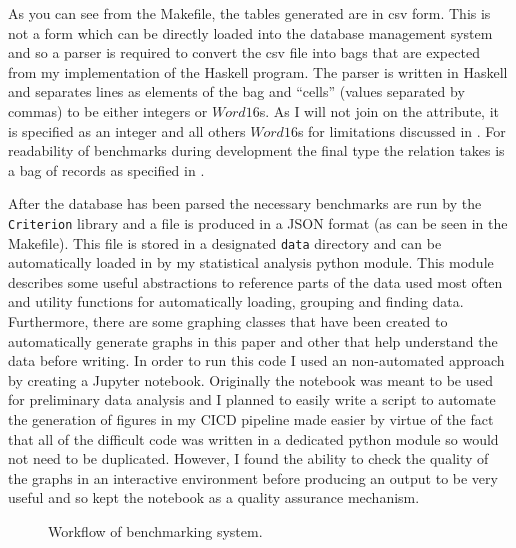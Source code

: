As you can see from the Makefile, the tables generated are in csv form. This is
not a form which can be directly loaded into the database management system and
so a parser is required to convert the csv file into bags that are expected from
my implementation of the Haskell program. The parser is written in Haskell and
separates lines as elements of the bag and ``cells'' (values separated by
commas) to be either integers or $Word16$s. As I will not join on the
 attribute, it is specified as an integer and all
others $Word16$s for limitations discussed in . For
readability of benchmarks during development the final type the
 relation takes is a bag of records as specified in
.

After the database has been parsed the necessary benchmarks are run by the
\verb|Criterion| library and a file is produced in a JSON format (as can be seen
in the Makefile). This file is stored in a designated \verb|data| directory and
can be automatically loaded in by my statistical analysis python module. This
module describes some useful abstractions to reference parts of the data used
most often and utility functions for automatically loading, grouping and finding
data. Furthermore, there are some graphing classes that have been created to
automatically generate graphs in this paper and other that help understand the
data before writing. In order to run this code I used an non-automated approach
by creating a Jupyter notebook. Originally the notebook was meant to be used for
preliminary data analysis and I planned to easily write a script to automate the
generation of figures in my CICD pipeline made easier by virtue of the fact that 
all of the difficult code was written in a dedicated python module so would not
need to be duplicated. However, I found the ability to check the quality of the
graphs in an interactive environment before producing an output to be very
useful and so kept the notebook as a quality assurance mechanism.

\begin{figure}[h]
    \centering
    \caption{Workflow of benchmarking system.}
    \label{fig:benchmark:workflow}
\end{figure}
